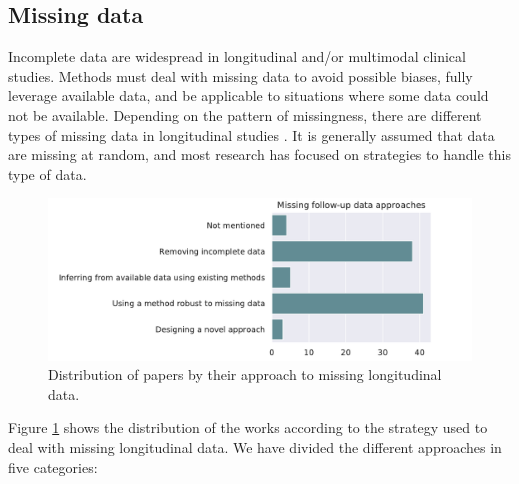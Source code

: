 \subsection{Missing data}

Incomplete data are widespread in longitudinal and/or multimodal clinical studies. Methods must deal with missing data to avoid possible biases, fully leverage available data, and be applicable to situations where some data could not be available. Depending on the pattern of missingness, there are different types of missing data in longitudinal studies \cite{Liu2015b}. It is generally assumed that data are missing at random, and most research has focused on strategies to handle this type of data.  \\

\begin{figure}[!htbp]
     \centering
     \includegraphics[width=1.0\textwidth]{figures/review/Fig7.pdf}
     \caption{Distribution of papers by their approach to missing longitudinal data.}
     \label{fig:missingfoll}

\end{figure}

Figure \ref{fig:missingfoll} shows the distribution of the works according to the strategy used to deal with missing longitudinal data. We have divided the different approaches in five categories: \\

